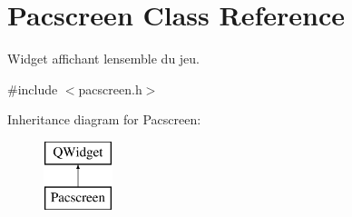 \hypertarget{class_pacscreen}{}\section{Pacscreen Class Reference}
\label{class_pacscreen}


Widget affichant l\textquotesingle{}ensemble du jeu.  




{\ttfamily \#include $<$pacscreen.\+h$>$}

Inheritance diagram for Pacscreen\+:\begin{figure}[H]
\begin{center}
\leavevmode
\includegraphics[height=2.000000cm]{class_pacscreen}
\end{center}
\end{figure}
